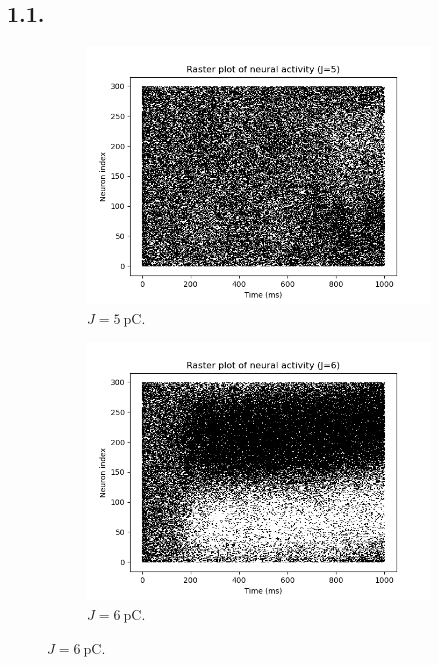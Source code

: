 \documentclass{article}
\begin{document}
\subsection*{1.1.}
\begin{figure}[h!]
  \centering
  \begin{subfigure}[b]{0.32\textwidth}
    \includegraphics[width=\textwidth]{figures/1.1.raster_plot_J5.png}
    \caption{\(J=\qty{5}{\pico\coulomb}\).}
    \label{fig:J5}
  \end{subfigure}
  \hfill
  \begin{subfigure}[b]{0.32\textwidth}
    \includegraphics[width=\textwidth]{figures/1.1.raster_plot_J6.png}
    \caption{\(J=\qty{6}{\pico\coulomb}\).}
    \label{fig:J6}

\end{subfigure}
\end{figure}
\end{document}
